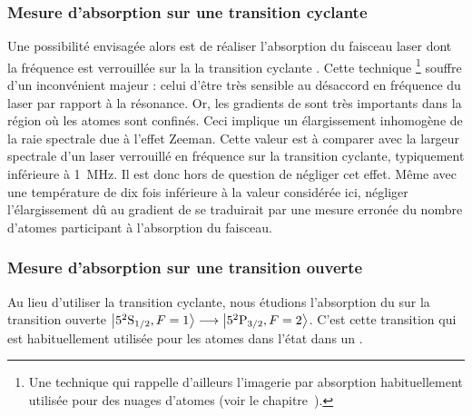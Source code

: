 \subsubsection{Mesure d'absorption sur une transition cyclante}
Une possibilité envisagée alors est de réaliser l'absorption du faisceau laser dont la fréquence est verrouillée sur la la transition cyclante \TransCycle. Cette technique%
\footnote{Une technique qui rappelle d'ailleurs l'imagerie par absorption habituellement utilisée pour des nuages d'atomes (voir le chapitre~).%
} 
souffre d'un inconvénient majeur : celui d'être très sensible au désaccord en fréquence du laser par rapport à la résonance. Or, les gradients de \chm sont très importants dans la région où les atomes sont confinés. Ceci implique un élargissement inhomogène de la raie spectrale due à l'effet Zeeman.
Cette valeur est à comparer avec la largeur spectrale d'un laser verrouillé en fréquence sur la transition cyclante, typiquement inférieure à \SI{1}{\mega\hertz}. 
Il est donc hors de question de négliger cet effet. Même avec une température de \jat dix fois inférieure à la valeur considérée ici, négliger l'élargissement dû au gradient de \chm se traduirait par une mesure erronée du nombre d'atomes participant à l'absorption du faisceau.

\subsubsection{Mesure d'absorption sur une transition ouverte}\label{sec:MesureDensiteGuideOuvert}
{\AjouteLigne}
Au lieu d'utiliser la transition cyclante, nous étudions l'absorption du \jat sur la transition ouverte ${{{\left| {{5^2 {\rm S}_{{1}/{2}}}, F=1 } \right\rangle}} \longrightarrow {{\left| {{\ensuremath{5^2 {\rm P}_{{3}/{2}}}}, F=2 } \right\rangle}}}$. 
C'est cette transition qui est habituellement utilisée pour  les atomes dans l'état  dans un \pmo.

